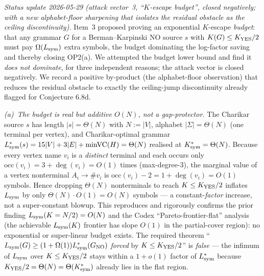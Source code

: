 \documentclass[
]{article}
\begin{document}
\emph{Status update 2026-05-29 (attack vector~3, ``$K$-escape budget'',
closed negatively; with a new alphabet-floor sharpening that
isolates the residual obstacle as the ceiling discontinuity).} Item~3
proposed proving an exponential $K$-escape \emph{budget}: that any
grammar $G$ for a Berman--Karpinski NO source $s$ with $K(G) \leq
K_{\rm YES}/2$ must pay $\Omega(L_{\rm sym})$ extra symbols, the budget
dominating the log-factor saving and thereby closing OP2(a). We
attempted the budget lower bound and find it \emph{does not dominate},
for three independent reasons; the attack vector is closed negatively.
We record a positive by-product (the alphabet-floor observation)
that reduces the residual obstacle to exactly the ceiling-jump
discontinuity already flagged for Conjecture 6.8d.

\emph{(a)~The budget is real but additive $O(N)$, not a
gap-protector.} The Charikar source $s$ has length $|s| = \Theta(N)$
with $N := |V|$, alphabet $|\Sigma| = \Theta(N)$ (one terminal per
vertex), and Charikar-optimal grammar $L^*_{\rm sym}(s) = 15|V| +
3|E| + \mathrm{minVC}(H) = \Theta(N)$ realised at $K^*_{\rm sym} =
\Theta(N)$. Because every vertex name $v_i$ is a \emph{distinct}
terminal and each occurs only $\mathrm{occ}(v_i) = 3 + \deg(v_i) =
O(1)$ times (max-degree-3), the marginal value of a vertex
nonterminal $A_i \to \#v_i$ is $\mathrm{occ}(v_i) - 2 = 1 +
\deg(v_i) = O(1)$ symbols. Hence dropping $\Theta(N)$ nonterminals to
reach $K \leq K_{\rm YES}/2$ inflates $L_{\rm sym}$ by only
$\Theta(N) \cdot O(1) = O(N)$ symbols --- a constant-\emph{factor}
increase, not a super-constant blowup. This reproduces and rigorously
confirms the prior finding $L_{\rm sym}(K = N/2) = O(N)$ and the
Codex ``Pareto-frontier-flat'' analysis (the achievable $L_{\rm
sym}(K)$ frontier has slope $O(1)$ in the partial-cover region): no
exponential or super-linear budget exists. The required theorem
``$L_{\rm sym}(G) \geq (1 + \Omega(1)) L^*_{\rm sym}(G_{\rm NO})$
\emph{forced} by $K \leq K_{\rm YES}/2$'' is \emph{false} --- the
infimum of $L_{\rm sym}$ over $K \leq K_{\rm YES}/2$ stays within a
$1 + o(1)$ factor of $L^*_{\rm sym}$ because $K_{\rm YES}/2 =
\Theta(N) = \Theta(K^*_{\rm sym})$ already lies in the flat region.
\end{document}
